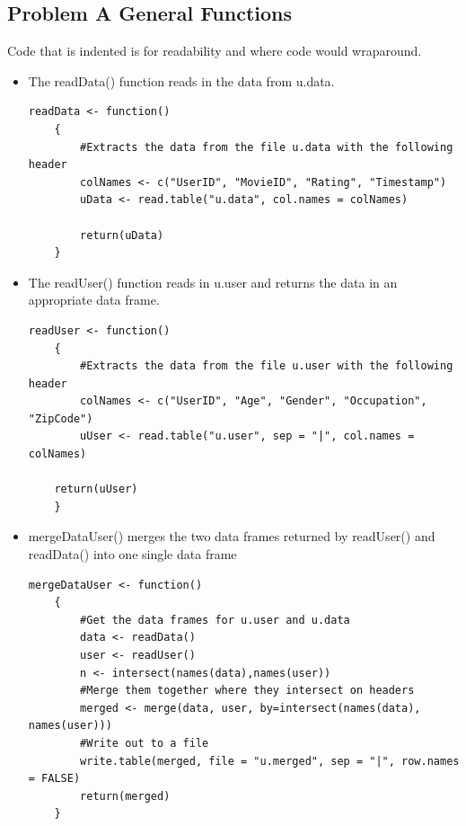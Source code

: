 \documentclass[11pt]{article}  %
\begin{document}
\subsection{Problem A General Functions}
\label{sec:probagen}
Code that is indented is for readability and where code would wraparound.
\begin{itemize}
    \label{appendix:readData}
    \item The readData() function reads in the data from u.data.
    \begin{lstlisting}[basicstyle=\small]
    readData <- function()
    {
    	#Extracts the data from the file u.data with the following header
    	colNames <- c("UserID", "MovieID", "Rating", "Timestamp")
    	uData <- read.table("u.data", col.names = colNames)
    	
    	return(uData)
    }
    \end{lstlisting}
    
    \label{appendix:readUser}
    \item The readUser() function reads in u.user and returns the data in an appropriate data frame.
    \begin{lstlisting}[basicstyle=\small]
    readUser <- function()
    {
    	#Extracts the data from the file u.user with the following header
    	colNames <- c("UserID", "Age", "Gender", "Occupation", "ZipCode")
    	uUser <- read.table("u.user", sep = "|", col.names = colNames)

	return(uUser)
    }
    \end{lstlisting}
    

    \item mergeDataUser() merges the two data frames returned by readUser() and readData() into one single data frame
    \begin{lstlisting}[basicstyle=\small]
    mergeDataUser <- function()
    {
    	#Get the data frames for u.user and u.data
    	data <- readData()
    	user <- readUser()
    	n <- intersect(names(data),names(user))
    	#Merge them together where they intersect on headers
    	merged <- merge(data, user, by=intersect(names(data), names(user)))
    	#Write out to a file
    	write.table(merged, file = "u.merged", sep = "|", row.names = FALSE)
    	return(merged)
    }
    \end{lstlisting}
    


\end{itemize}
\end{document}
